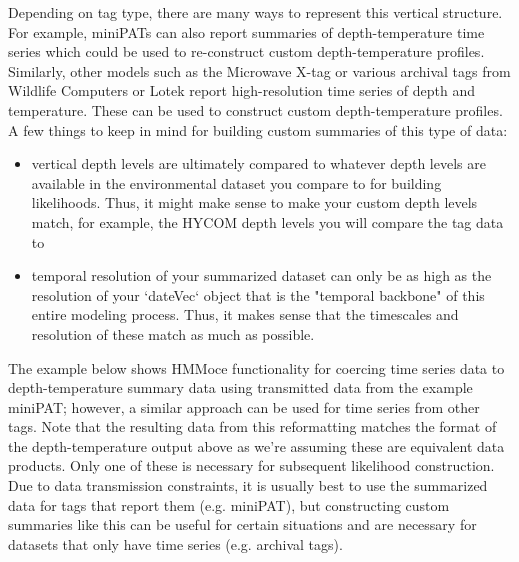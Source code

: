 \documentclass{article}\usepackage[]{graphicx}\usepackage[]{color}
\begin{document}
Depending on tag type, there are many ways to represent this vertical structure. For example, miniPATs can also report summaries of depth-temperature time series which could be used to re-construct custom depth-temperature profiles. Similarly, other models such as the Microwave X-tag or various archival tags from Wildlife Computers or Lotek report high-resolution time series of depth and temperature. These can be used to construct custom depth-temperature profiles. A few things to keep in mind for building custom summaries of this type of data:
\begin{itemize}
\item vertical depth levels are ultimately compared to whatever depth levels are available in the environmental dataset you compare to for building likelihoods. Thus, it might make sense to make your custom depth levels match, for example, the HYCOM depth levels you will compare the tag data to
\item temporal resolution of your summarized dataset can only be as high as the resolution of your `dateVec` object that is the "temporal backbone" of this entire modeling process. Thus, it makes sense that the timescales and resolution of these match as much as possible.
\end{itemize}

The example below shows HMMoce functionality for coercing time series data to depth-temperature summary data using transmitted data from the example miniPAT; however, a similar approach can be used for time series from other tags. Note that the resulting data from this reformatting matches the format of the depth-temperature output above as we're assuming these are equivalent data products. Only one of these is necessary for subsequent likelihood construction. Due to data transmission constraints, it is usually best to use the summarized data for tags that report them (e.g. miniPAT), but constructing custom summaries like this can be useful for certain situations and are necessary for datasets that only have time series (e.g. archival tags).
\end{document}
